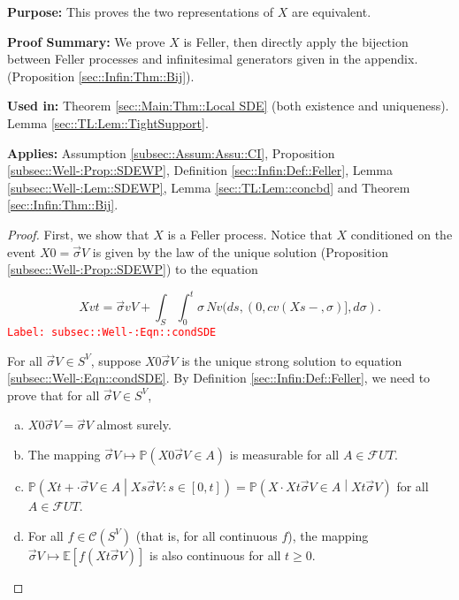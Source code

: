 \documentclass[12pt]{article}
\newcommand{\mb}{\mathbb}
\newcommand{\mc}{\mathcal}
\newcommand{\tr}{\textcolor{red}}
\newcommand{\labe}[1]{\tr{\texttt{Label: #1}}}
\newcommand{\purpose}{\textbf{Purpose: }}
\newcommand{\pfsum}{\textbf{Proof Summary: }}
\newcommand{\usein}{\textbf{Used in: }}
\newcommand{\app}{\textbf{Applies: }}
\newcommand{\pr}{\mb{P}}							%
\newcommand{\ex}[1]{\mb{E}\left[#1\right]}			%
\renewcommand{\v}{v}							%
\renewcommand{\U}{U}							%
\renewcommand{\S}{S}							%
\newcommand{\s}{\sigma}							%
\newcommand{\sv}{\vec{\s}}						%
\newcommand{\T}{T}								%
\renewcommand{\t}{t}							%
\renewcommand{\tt}{s}							%
\newcommand{\F}{\mc{F}}							%
\newcommand{\X}{X}								%
\newcommand{\IGr}{c}							%
\newcommand{\cont}{\mc{C}}						%
\newcommand{\poiss}{N}							%
\begin{document}
\purpose This proves the two representations of \(\X{}{}\) are equivalent.

\pfsum We prove \(\X{}{}\) is Feller, then directly apply the bijection between Feller processes and infinitesimal generators given in the appendix. (Proposition \ref{sec::Infin:Thm::Bij}).

\usein Theorem \ref{sec::Main:Thm::Local SDE} (both existence and uniqueness). Lemma \ref{sec::TL:Lem::TightSupport}.

\app Assumption \ref{subsec::Assum:Assu::CI}, Proposition \ref{subsec::Well-:Prop::SDEWP}, Definition \ref{sec::Infin:Def::Feller}, Lemma \ref{subsec::Well-:Lem::SDEWP}, Lemma \ref{sec::TL:Lem::concbd} and Theorem \ref{sec::Infin:Thm::Bij}.

\begin{proof}
First, we show that \(\X{}{}\) is a Feller process. Notice that \(\X{}{}\) conditioned on the event \(\X{}{0} = \sv{}{ V}\) is given by the law of the unique solution (Proposition \ref{subsec::Well-:Prop::SDEWP}) to the equation

\begin{equation}
\X{\v}{\t} = \sv{\v}{ V} + \int_\S\int_0^\t \s\,\poiss{\v}(d\tt,(0,\IGr{\v}(\X{}{\tt-},\s)],d\s).
\label{subsec::Well-:Eqn::condSDE}
\end{equation}
\labe{subsec::Well-:Eqn::condSDE}

For all \(\sv{}{ V}\in\S^ V\), suppose \(\X{}{0}{\sv{}{ V}}\) is the unique strong solution to equation \eqref{subsec::Well-:Eqn::condSDE}. By Definition \ref{sec::Infin:Def::Feller}, we need to prove that for all \(\sv{}{ V}\in \S^ V\),

\begin{enumerate}[(a)]
\item \(\X{}{0}{\sv{}{ V}} = \sv{}{ V}\) almost surely.

\item The mapping \(\sv{}{ V}\mapsto \pr\left(\X{}{0}{\sv{}{ V}}\in A\right)\) is measurable for all \(A\in \F{\U}{\T}\).

\item \(\pr\left(\X{}{\t+\cdot}{\sv{}{ V}}\in A\middle|\X{}{\tt}{\sv{}{ V}}:\tt \in [0,\t]\right) = \pr\left(\X{}{\cdot}{\X{}{\t}{\sv{}{ V}}} \in A\middle| \X{}{\t}{\sv{}{ V}} \right)\) for all \(A \in \F{\U}{\T}\).

\item For all \(f \in \cont(\S^ V)\) (that is, for all continuous \(f\)), the mapping \(\sv{}{ V}\mapsto \ex{f(\X{}{\t}{\sv{}{ V}})}\) is also continuous for all \(t\geq 0\).
\end{enumerate}


\end{proof}
\end{document}
